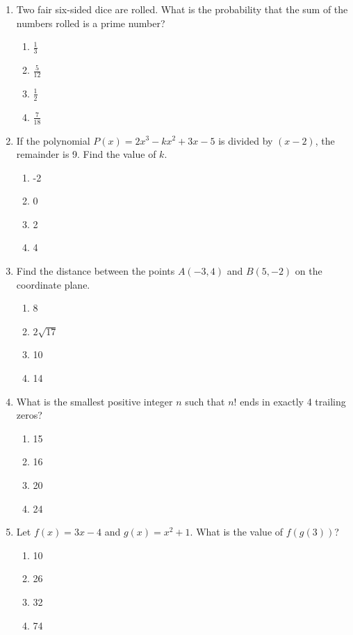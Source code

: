 \documentclass[12pt]{article}
\begin{document}
\begin{enumerate}
    \item Two fair six-sided dice are rolled. What is the probability that the sum of the numbers rolled is a prime number?
    \begin{enumerate}
        \item $\frac{1}{3}$
        \item $\frac{5}{12}$
        \item $\frac{1}{2}$
        \item $\frac{7}{18}$
    \end{enumerate}

    \item If the polynomial $P(x) = 2x^3 - kx^2 + 3x - 5$ is divided by $(x - 2)$, the remainder is 9. Find the value of $k$.
    \begin{enumerate}
        \item -2
        \item 0
        \item 2
        \item 4
    \end{enumerate}

    \item Find the distance between the points $A(-3, 4)$ and $B(5, -2)$ on the coordinate plane.
    \begin{enumerate}
        \item 8
        \item $2\sqrt{17}$
        \item 10
        \item 14
    \end{enumerate}

    \item What is the smallest positive integer $n$ such that $n!$ ends in exactly 4 trailing zeros?
    \begin{enumerate}
        \item 15
        \item 16
        \item 20
        \item 24
    \end{enumerate}

    \item Let $f(x) = 3x - 4$ and $g(x) = x^2 + 1$. What is the value of $f(g(3))$?
    \begin{enumerate}
        \item 10
        \item 26
        \item 32
        \item 74
    \end{enumerate}


\end{enumerate}
\end{document}
